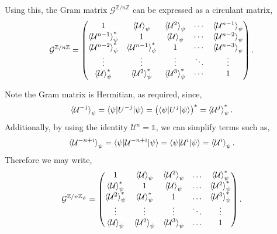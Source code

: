 \documentclass[12pt,letterpaper]{article}
\begin{document}
\begin{multicols}{2}
Using this, the Gram matrix $\mathcal{G}^{\mathbb{Z}/n\mathbb{Z}}$ can be expressed as a circulant matrix,
\begin{align*}
	\mathcal{G}^{\mathbb{Z}/n\mathbb{Z}} = \begin{pmatrix}
 1 & \braket{\mathcal{U}}_{\psi} & \braket{\mathcal{U}^2}_{\psi} & \cdots & \braket{\mathcal{U}^{n-1}}_{\psi} \\
 \braket{\mathcal{U}^{n-1}}_{\psi}^* & 1 & \braket{\mathcal{U}}_{\psi} & \cdots & \braket{\mathcal{U}^{n-2}}_{\psi} \\
 \braket{\mathcal{U}^{n-2}}_{\psi}^* & \braket{\mathcal{U}^{n-1}}_{\psi}^* & 1 & \cdots & \braket{\mathcal{U}^{n-3}}_{\psi} \\
 \vdots & \vdots & \vdots & \ddots & \vdots \\
 \braket{\mathcal{U}}_{\psi}^* & \braket{\mathcal{U}^{2}}_{\psi}^* & \braket{\mathcal{U}^{3}}_{\psi}^* & \cdots & 1
\end{pmatrix}.
\end{align*}

Note the Gram matrix is Hermitian, as required, since,
\begin{align*}
    \braket{\mathcal{U}^{-j}}_{\psi} = \braket{\psi | U^{-j} | \psi} = \left(\braket{\psi | U^j | \psi}\right)^* = \braket{\mathcal{U}^j}_{\psi}^*.
\end{align*}
Additionally, by using the identity $\mathcal{U}^n = \mathds{1}$, we can simplify terms such as,
\begin{align*}
	\braket{\mathcal{U}^{-n+i}}_\psi = \braket{\psi | \mathcal{U}^{-n+i} | \psi} = \braket{\psi | \mathcal{U}^i | \psi} = \braket{\mathcal{U}^i}_\psi.
\end{align*}
Therefore we may write,
\begin{align*}
	\mathcal{G}^{\mathbb{Z}/n\mathbb{Z}_{\psi}} = \begin{pmatrix}
 1 & \braket{\mathcal{U}}_{\psi} & \braket{\mathcal{U}^{2}}_{\psi} & \hdots &  \braket{\mathcal{U}}_{\psi}^* \\
  \braket{\mathcal{U}}_{\psi}^* & 1 & \braket{\mathcal{U}}_{\psi} & \hdots &  \braket{\mathcal{U}^{2}}_{\psi}^* \\
    \braket{\mathcal{U}^{2}}_{\psi}^* &  \braket{\mathcal{U}}_{\psi}^*  & 1 & \hdots &  \braket{\mathcal{U}^{3}}_{\psi}^* \\
   \vdots & \vdots & \vdots & \ddots & \vdots \\
  \braket{\mathcal{U}}_{\psi} & \braket{\mathcal{U}^{2}}_{\psi}  & \braket{\mathcal{U}^{3}}_{\psi}  & \hdots &  1 
\end{pmatrix}.
\end{align*}


\end{multicols}
\end{document}
